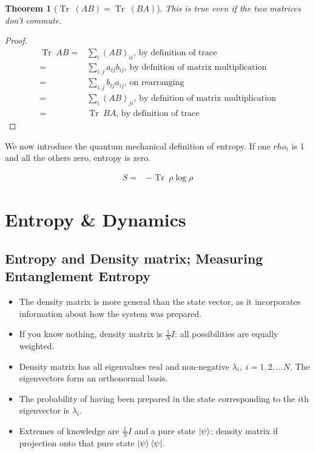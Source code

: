 \documentclass[]{article}
\newtheorem{thm}{Theorem}
\DeclareMathOperator{\Tr}{Tr \;}
\begin{document}
\begin{thm}[$\Tr(AB)=\Tr(BA)$]This is true even if the two matrices don't commute.
\end{thm}
\begin{proof}
	\begin{align*}
		\Tr AB =& \sum_i (AB)_{ii} \text{, by definition of trace}\\
		=& \sum_{i,j} a_{ij} b_{ij} \text{, by defnition of matrix multiplication}\\
		=& \sum_{i,j} b_{ij} a_{ij} \text{, on rearranging}\\
		=& \sum_i (AB)_{ji} \text{, by defnition of matrix multiplication}\\
		=& \Tr BA \text{, by definition of trace}
	\end{align*}
\end{proof}
We now introduce the quantum mechanical definition of entropy. If one $rho_i$ is 1 and all the others zero, entropy is zero.

\begin{align*}
	S =& -\Tr \rho \log{\rho}
\end{align*}


\section{Entropy \& Dynamics}

\subsection{Entropy and Density matrix; Measuring Entanglement Entropy} 

\begin{itemize}
	\item The density matrix is more general than the state vector, as it incorporates information about how the system was prepared. 
	\item If you know nothing, density matrix is $\frac{1}{N}I$: all possibilities are equally weighted.
	\item Density matrix has all eigenvalues real and non-negative $\lambda_i,\; i=1,2,...N$. The eigenvectors form an orthonormal basis.
	\item  The probability of having been prepared in the state corresponding to the $i$th eigenvector is $\lambda_i$.
	\item Extremes of knowledge are $\frac{1}{N}I$ and a pure state $\ket{\psi}$: density matrix if projection onto that pure state $\ket{\psi} \bra{\psi}$. 
\end{itemize}
\end{document}
